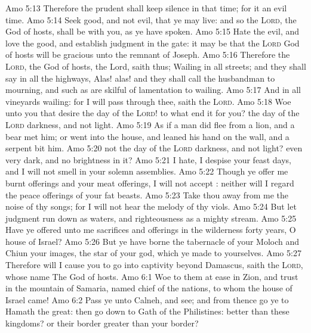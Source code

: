\vs Amo 5:13 Therefore the prudent shall keep silence in that time; for it  an evil time.
\vs Amo 5:14 Seek good, and not evil, that ye may live: and so the \textsc{Lord}, the God of hosts, shall be with you, as ye have spoken.
\vs Amo 5:15 Hate the evil, and love the good, and establish judgment in the gate: it may be that the \textsc{Lord} God of hosts will be gracious unto the remnant of Joseph.
\vs Amo 5:16 Therefore the \textsc{Lord}, the God of hosts, the Lord, saith thus; Wailing  in all streets; and they shall say in all the highways, Alas! alas! and they shall call the husbandman to mourning, and such as are skilful of lamentation to wailing.
\vs Amo 5:17 And in all vineyards  wailing: for I will pass through thee, saith the \textsc{Lord}.
\vs Amo 5:18 Woe unto you that desire the day of the \textsc{Lord}! to what end  it for you? the day of the \textsc{Lord}  darkness, and not light.
\vs Amo 5:19 As if a man did flee from a lion, and a bear met him; or went into the house, and leaned his hand on the wall, and a serpent bit him.
\vs Amo 5:20  not the day of the \textsc{Lord}  darkness, and not light? even very dark, and no brightness in it?
\vs Amo 5:21 I hate, I despise your feast days, and I will not smell in your solemn assemblies.
\vs Amo 5:22 Though ye offer me burnt offerings and your meat offerings, I will not accept : neither will I regard the peace offerings of your fat beasts.
\vs Amo 5:23 Take thou away from me the noise of thy songs; for I will not hear the melody of thy viols.
\vs Amo 5:24 But let judgment run down as waters, and righteousness as a mighty stream.
\vs Amo 5:25 Have ye offered unto me sacrifices and offerings in the wilderness forty years, O house of Israel?
\vs Amo 5:26 But ye have borne the tabernacle of your Moloch and Chiun your images, the star of your god, which ye made to yourselves.
\vs Amo 5:27 Therefore will I cause you to go into captivity beyond Damascus, saith the \textsc{Lord}, whose name  The God of hosts.
\vs Amo 6:1 Woe to them  at ease in Zion, and trust in the mountain of Samaria,  named chief of the nations, to whom the house of Israel came!
\vs Amo 6:2 Pass ye unto Calneh, and see; and from thence go ye to Hamath the great: then go down to Gath of the Philistines:  better than these kingdoms? or their border greater than your border?
